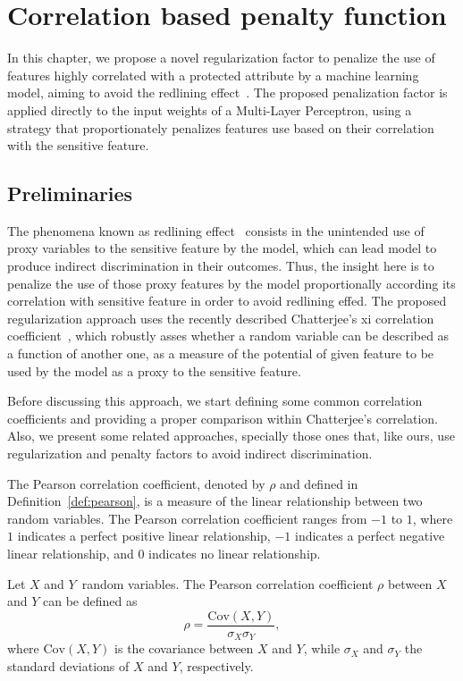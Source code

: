 \chapter{Correlation based penalty function}

In this chapter, we propose a novel regularization factor to penalize the use of features highly correlated with a protected attribute by a machine learning model, aiming to avoid the redlining effect~\citep{Pedreschi2008}. The proposed penalization factor is applied directly to the input weights of a Multi-Layer Perceptron, using a strategy that proportionately penalizes features use based on their correlation with the sensitive feature.

\section{Preliminaries}

The phenomena known as redlining effect~\citep{Pedreschi2008} consists in the unintended use of proxy variables to the sensitive feature by the model, which can lead model to produce indirect discrimination in their outcomes.  Thus, the insight here is to penalize the use of those proxy features by the model proportionally according its correlation with sensitive feature in order to avoid redlining effed. The proposed regularization approach uses the recently described Chatterjee's xi correlation coefficient~\cite{chatterjee2020new}, which robustly asses whether a random variable can be described as a function of another one, as a measure of the potential of given feature to be used by the model as a proxy to the sensitive feature. 

Before discussing this approach, we start defining some common correlation coefficients and providing a proper comparison within Chatterjee's correlation. Also, we present some related approaches, specially those ones that, like ours, use regularization and penalty factors to avoid indirect discrimination.

The Pearson correlation coefficient, denoted by $\rho$ and defined in Definition~\ref{def:pearson}, is a measure of the linear relationship between two random variables. The Pearson correlation coefficient ranges from $-1$ to $1$, where $1$ indicates a perfect positive linear relationship, $-1$ indicates a perfect negative linear relationship, and $0$ indicates no linear relationship.

\begin{definition}\label{def:pearson}
Let  $X$ and $Y$\ random variables. The Pearson correlation coefficient $\rho$ between $X$ and $Y$ can be defined as  
\begin{equation}
\rho = \frac{\mathrm{Cov}(X, Y)}{\sigma_X \sigma_Y},
\end{equation}
where $\mathrm{Cov}(X, Y)$ is the covariance between $X$ and $Y$, while $\sigma_X$ and $\sigma_Y$ the standard deviations of $X$ and $Y$, respectively. 
\end{definition}

